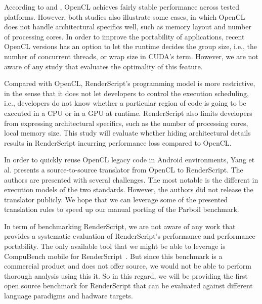 According to \cite{komatsu2010evaluating} and \cite{dolbeau2013one},
OpenCL achieves fairly stable performance across tested platforms. However, both
studies also illustrate some cases, in which OpenCL does not handle
architectural specifics well, such as memory layout and number of processing
cores. In order to improve the portability of applications, recent OpenCL
versions has an option to let the runtime decides the group size, i.e., the
number of concurrent threads, or wrap size in CUDA's term. However, we are not
aware of any study that evaluates the optimality of this feature.

Compared with OpenCL, RenderScript's programming model is more restrictive, in
the sense that it does not let developers to control the execution scheduling,
i.e., developers do not know whether a particular region of code is going to be
executed in a CPU or in a GPU at runtime. RenderScript also limits developers from
expressing architectural specifics, such as the number of processing cores, local
memory size. This study will evaluate whether hiding architectural details
    results in RenderScript incurring performance loss compared to OpenCL.

In order to quickly reuse OpenCL legacy code in Android environments, Yang et al.
\cite{yang2012o2render} presents a source-to-source translator from OpenCL
to RenderScript. The authors are presented with several challenges.
The most notable is the different in execution models of the two standards.
However, the authors did not release the translator publicly.
We hope that we can leverage some of the presented translation rules
to speed up our manual porting of the Parboil benchmark.

In term of benchmarking RenderScript, we are not aware of any work that provides
a systematic evaluation of RenderScript's performance and performance
portability. The only available tool that we might be able to leverage is
CompuBench mobile for RenderScript~\cite{compuBenchMobile}.
But since this benchmark is a commercial product and does not offer source, we would not be able to
perform thorough analysis using this it.
So in this regard, we will be providing the first open source benchmark for
    RenderScript that can be evaluated against different language paradigms 
    and hadware targets.
